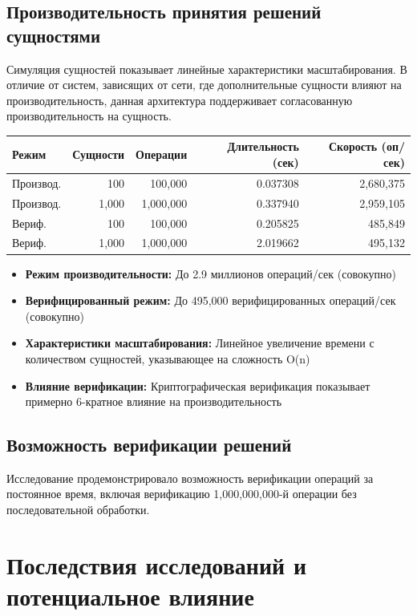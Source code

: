 \documentclass[14pt, a4paper]{extarticle}
\begin{document}
\subsection{Производительность принятия решений сущностями}

Симуляция сущностей показывает линейные характеристики масштабирования. В отличие от систем, зависящих от сети, где дополнительные сущности влияют на производительность, данная архитектура поддерживает согласованную производительность на сущность.

\begin{center}
\begin{tabular}{|l|r|r|r|r|}
\hline
\textbf{Режим} & \textbf{Сущности} & \textbf{Операции} & \textbf{Длительность (сек)} & \textbf{Скорость (оп/сек)} \\
\hline
Производ. & 100 & 100,000 & 0.037308 & 2,680,375 \\
\hline
Производ. & 1,000 & 1,000,000 & 0.337940 & 2,959,105 \\
\hline
Вериф. & 100 & 100,000 & 0.205825 & 485,849 \\
\hline
Вериф. & 1,000 & 1,000,000 & 2.019662 & 495,132 \\
\hline
\end{tabular}
\end{center}

\begin{itemize}
    \item \textbf{Режим производительности:} До 2.9 миллионов операций/сек (совокупно)
    \item \textbf{Верифицированный режим:} До 495,000 верифицированных операций/сек (совокупно)
    \item \textbf{Характеристики масштабирования:} Линейное увеличение времени с количеством сущностей, указывающее на сложность O(n)
    \item \textbf{Влияние верификации:} Криптографическая верификация показывает примерно 6-кратное влияние на производительность
\end{itemize}

\subsection{Возможность верификации решений}
Исследование продемонстрировало возможность верификации операций за постоянное время, включая верификацию 1,000,000,000-й операции без последовательной обработки.

\section{Последствия исследований и потенциальное влияние}
\end{document}
